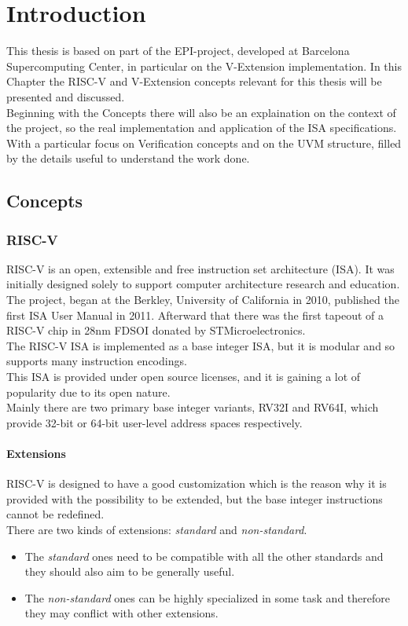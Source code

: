 \chapter{Introduction}
This thesis is based on part of the EPI-project, developed at Barcelona Supercomputing Center, in particular on the V-Extension implementation.
In this Chapter the RISC-V and V-Extension concepts relevant for this thesis will be presented and discussed.\\
Beginning with the Concepts there will also be an explaination on the context of the project, so the real implementation and application of the ISA specifications.
With a particular focus on Verification concepts and on the UVM structure, filled by the details useful to understand the work done.\\




\section{Concepts}
\subsection{RISC-V}
RISC-V is an open, extensible and free instruction set architecture (ISA). It was initially designed solely to support computer architecture research and education\cite{RISC-V-Instruction-Set-Manual}.\\
The project, began at the Berkley, University of California in 2010, published the first ISA User Manual in 2011. Afterward that there was the first tapeout of a RISC-V chip in 28nm FDSOI donated by STMicroelectronics.\\

The RISC-V ISA is implemented as a base integer ISA, but it is modular and so supports many instruction encodings.\\
This ISA is provided under open source licenses, and it is gaining a lot of popularity due to its open nature. \\
Mainly there are two primary base integer variants, RV32I and RV64I, which provide 32-bit or 64-bit user-level address spaces respectively.\\

\subsubsection{Extensions}

RISC-V is designed to have a good customization which is the reason why it is provided with the possibility to be extended, but the base integer instructions cannot be redeﬁned.\\
There are two kinds of extensions:
\textit{standard} and \textit{non-standard}.
\begin{itemize}
    \item The \textit{standard} ones need to be compatible with all the other standards and they should also aim to be generally useful.
    \item The \textit{non-standard} ones can be highly specialized in some task and therefore they may conflict with other extensions.
\end{itemize}

